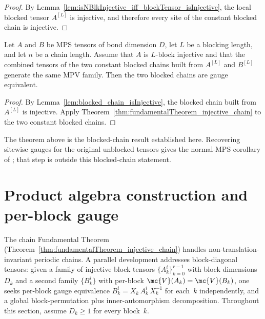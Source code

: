 \begin{proof}
    \leanok
    By Lemma~\ref{lem:isNBlkInjective_iff_blockTensor_isInjective}, the local
    blocked tensor $A^{[L]}$ is injective, and therefore every site of the
    constant blocked chain is injective.
\end{proof}

\begin{theorem}
    \label{thm:fundamentalTheorem_blockedChain}
    \leanok
    Let $A$ and $B$ be MPS tensors of bond dimension $D$, let $L$ be a
    blocking length, and let $n$ be a chain length.
    Assume that $A$ is $L$-block injective and that the combined tensors of the
    two constant blocked chains built from $A^{[L]}$ and $B^{[L]}$ generate the
    same MPV family.
    Then the two blocked chains are gauge equivalent.
\end{theorem}

\begin{proof}
    \leanok
    By Lemma~\ref{lem:blocked_chain_isInjective}, the blocked chain built from
    $A^{[L]}$ is injective.
    Apply Theorem~\ref{thm:fundamentalTheorem_injective_chain} to the two
    constant blocked chains.
\end{proof}

\begin{remark}
    The theorem above is the blocked-chain result established here.
    Recovering sitewise gauges for the original unblocked tensors gives the
    normal-MPS corollary of \cite{Molnar2018NormalPEPS}; that step is outside
    this blocked-chain statement.
\end{remark}

\section{Product algebra construction and per-block gauge}%
\label{sec:pi_algebra}

The chain Fundamental Theorem
(Theorem~\ref{thm:fundamentalTheorem_injective_chain}) handles
non-translation-invariant periodic chains.
A parallel development addresses block-diagonal tensors:
given a family of injective block tensors $\{A_k^i\}_{k=0}^{r-1}$
with block dimensions $D_k$ and a second family $\{B_k^i\}$ with
per-block $\mc{V}(A_k) = \mc{V}(B_k)$, one seeks per-block gauge
equivalence $B_k^i = X_k\, A_k^i\, X_k^{-1}$ for each~$k$
independently, and a global block-permutation plus inner-automorphism
decomposition.
Throughout this section, assume $D_k \ge 1$ for every block~$k$.

